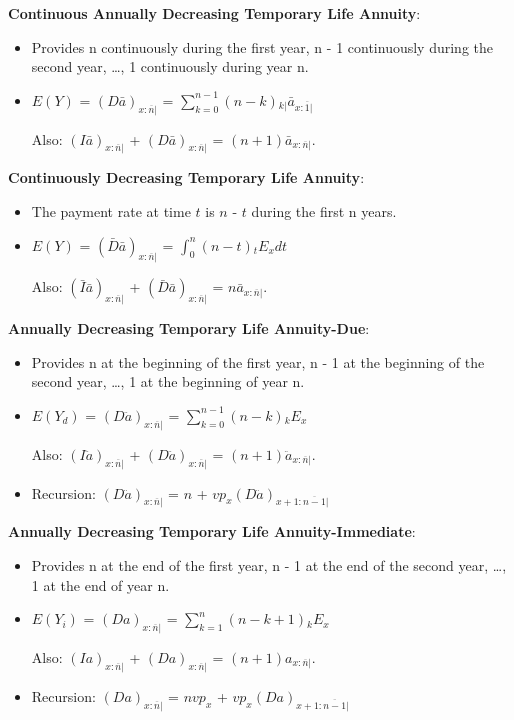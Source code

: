 \documentclass[]{book}
\begin{document}
\textbf{Continuous Annually Decreasing Temporary Life Annuity}:

\begin{itemize}
\item
  Provides n continuously during the first year, n - 1 continuously
  during the second year, \ldots{}, 1 continuously during year n.
\item
  \(E(Y)\) = \((D\bar{a})_{x: \overline{n}|}\) =
  \(\sum^{n - 1}_{k = 0} (n - k){}_{k|}\bar{a}_{x:\overline{1}|}\)

  Also: \((I\bar{a})_{x: \overline{n}|}\) +
  \((D\bar{a})_{x: \overline{n}|}\) =
  \((n + 1)\bar{a}_{x:\overline{n}|}\).
\end{itemize}

\textbf{Continuously Decreasing Temporary Life Annuity}:

\begin{itemize}
\item
  The payment rate at time \(t\) is \(n\) - \(t\) during the first n
  years.
\item
  \(E(Y)\) = \((\bar{D}\bar{a})_{x: \overline{n}|}\) =
  \(\int^{n}_0 (n - t){}_{t}E_x dt\)

  Also: \((\bar{I}\bar{a})_{x: \overline{n}|}\) +
  \((\bar{D}\bar{a})_{x: \overline{n}|}\) =
  \(n\bar{a}_{x:\overline{n}|}\).
\end{itemize}

\textbf{Annually Decreasing Temporary Life Annuity-Due}:

\begin{itemize}
\item
  Provides n at the beginning of the first year, n - 1 at the beginning
  of the second year, \ldots{}, 1 at the beginning of year n.
\item
  \(E(Y_d)\) = \((D\ddot{a})_{x: \overline{n}|}\) =
  \(\sum^{n - 1}_{k = 0} (n - k){}_{k}E_x\)

  Also: \((I\ddot{a})_{x: \overline{n}|}\) +
  \((D\ddot{a})_{x: \overline{n}|}\) =
  \((n + 1)\ddot{a}_{x:\overline{n}|}\).
\item
  Recursion: \((D\ddot{a})_{x: \overline{n}|}\) = \(n\) +
  \(vp_x(D\ddot{a})_{x + 1: \overline{n - 1}|}\)
\end{itemize}

\textbf{Annually Decreasing Temporary Life Annuity-Immediate}:

\begin{itemize}
\item
  Provides n at the end of the first year, n - 1 at the end of the
  second year, \ldots{}, 1 at the end of year n.
\item
  \(E(Y_i)\) = \((Da)_{x: \overline{n}|}\) =
  \(\sum^{n}_{k = 1} (n - k + 1){}_{k}E_x\)

  Also: \((Ia)_{x: \overline{n}|}\) + \((Da)_{x: \overline{n}|}\) =
  \((n + 1)a_{x: \overline{n}|}\).
\item
  Recursion: \((Da)_{x: \overline{n}|}\) = \(nvp_x\) +
  \(vp_x(Da)_{x + 1: \overline{n - 1}|}\)
\end{itemize}
\end{document}
